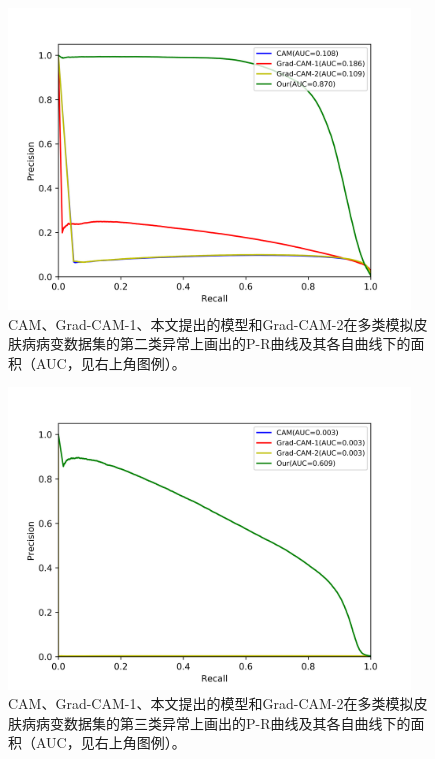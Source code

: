 \begin{figure}[H]
	\centering
	\includegraphics[width=0.95\textwidth]{figure/pr_curve_multi_skin/SKIN_pr_curve.png}
	\caption{CAM、Grad-CAM-1、本文提出的模型和Grad-CAM-2在多类模拟皮肤病病变数据集的第二类异常上画出的P-R曲线及其各自曲线下的面积（AUC，见右上角图例）。} 
	\label{fig:multi_simulate_pr_curve_skin}
\end{figure}
\vspace{-1.8cm}
\begin{figure}[H]
	\centering
	\includegraphics[width=0.95\textwidth]{figure/pr_curve_multi_skin/CIRCLE_pr_curve.png}
	\caption{CAM、Grad-CAM-1、本文提出的模型和Grad-CAM-2在多类模拟皮肤病病变数据集的第三类异常上画出的P-R曲线及其各自曲线下的面积（AUC，见右上角图例）。} 
	\label{fig:multi_simulate_pr_curve_circle}
\end{figure}


